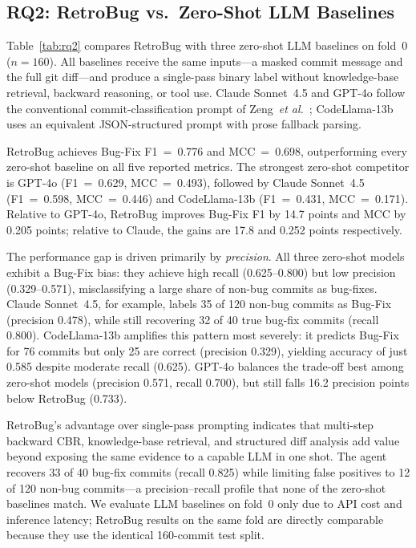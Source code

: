 %         

\subsection{RQ2: RetroBug vs.\ Zero-Shot LLM Baselines}
\label{sec:results:rq2}

Table~\ref{tab:rq2} compares RetroBug with three zero-shot LLM baselines
on fold~0 ($n=160$).
All baselines receive the same inputs---a masked commit message and the
full git diff---and produce a single-pass binary label without knowledge-base
retrieval, backward reasoning, or tool use.
Claude Sonnet~4.5 and GPT-4o follow the conventional commit-classification
prompt of Zeng~\textit{et al.}~\cite{zeng2025conventional}; CodeLlama-13b
uses an equivalent JSON-structured prompt with prose fallback parsing.

RetroBug achieves Bug-Fix F1~=~0.776 and MCC~=~0.698, outperforming every
zero-shot baseline on all five reported metrics.
The strongest zero-shot competitor is GPT-4o (F1~=~0.629, MCC~=~0.493),
followed by Claude Sonnet~4.5 (F1~=~0.598, MCC~=~0.446) and CodeLlama-13b
(F1~=~0.431, MCC~=~0.171).
Relative to GPT-4o, RetroBug improves Bug-Fix F1 by 14.7 points and MCC
by 0.205 points; relative to Claude, the gains are 17.8 and 0.252 points
respectively.

The performance gap is driven primarily by \emph{precision}.
All three zero-shot models exhibit a Bug-Fix bias: they achieve high recall
(0.625--0.800) but low precision (0.329--0.571), misclassifying a large
share of non-bug commits as bug-fixes.
Claude Sonnet~4.5, for example, labels 35 of 120 non-bug commits as
Bug-Fix (precision 0.478), while still recovering 32 of 40 true bug-fix
commits (recall 0.800).
CodeLlama-13b amplifies this pattern most severely: it predicts Bug-Fix
for 76 commits but only 25 are correct (precision 0.329), yielding accuracy
of just 0.585 despite moderate recall (0.625).
GPT-4o balances the trade-off best among zero-shot models (precision
0.571, recall 0.700), but still falls 16.2 precision points below
RetroBug (0.733).

RetroBug's advantage over single-pass prompting indicates that multi-step
backward CBR, knowledge-base retrieval, and structured diff analysis add
value beyond exposing the same evidence to a capable LLM in one shot.
The agent recovers 33 of 40 bug-fix commits (recall 0.825) while limiting
false positives to 12 of 120 non-bug commits---a precision--recall profile
that none of the zero-shot baselines match.
We evaluate LLM baselines on fold~0 only due to API cost and inference
latency; RetroBug results on the same fold are directly comparable because
they use the identical 160-commit test split.

